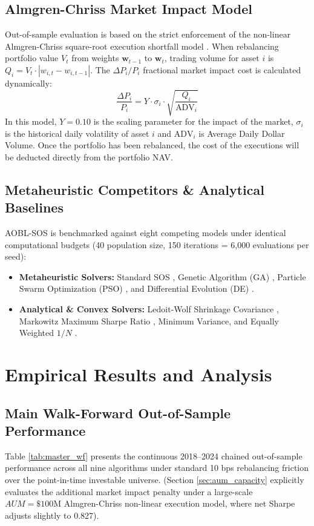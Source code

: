 \documentclass[11pt,a4paper]{article}
\begin{document}
\subsection{Almgren-Chriss Market Impact Model}
Out-of-sample evaluation is based on the strict enforcement of the non-linear Almgren-Chriss square-root execution shortfall model \cite{horst2024}. When rebalancing portfolio value $V_t$ from weights $\mathbf{w}_{t-1}$ to $\mathbf{w}_t$, trading volume for asset $i$ is $Q_i = V_t \cdot |w_{i, t} - w_{i, t-1}|$. The $\Delta P_i / P_i$ fractional market impact cost is calculated dynamically:
\begin{equation}
\frac{\Delta P_i}{P_i} = Y \cdot \sigma_i \cdot \sqrt{\frac{Q_i}{\text{ADV}_i}}
\end{equation}
In this model, $Y = 0.10$ is the scaling parameter for the impact of the market, $\sigma_i$ is the historical daily volatility of asset $i$ and $\text{ADV}_i$ is Average Daily Dollar Volume. Once the portfolio has been rebalanced, the cost of the executions will be deducted directly from the portfolio NAV.

\subsection{Metaheuristic Competitors & Analytical Baselines}
AOBL-SOS is benchmarked against eight competing models under identical computational budgets (40 population size, 150 iterations = 6,000 evaluations per seed):
\begin{itemize}
    \item \textbf{Metaheuristic Solvers:} Standard SOS \cite{cheng2014}, Genetic Algorithm (GA) \cite{holland1992}, Particle Swarm Optimization (PSO) \cite{kennedy1995}, and Differential Evolution (DE) \cite{storn1997}.
    \item \textbf{Analytical \& Convex Solvers:} Ledoit-Wolf Shrinkage Covariance \cite{ledoit2004}, Markowitz Maximum Sharpe Ratio \cite{markowitz1952}, Minimum Variance, and Equally Weighted $1/N$ \cite{demiguel2009}.
\end{itemize}

\section{Empirical Results and Analysis}

\subsection{Main Walk-Forward Out-of-Sample Performance}
Table \ref{tab:master_wf} presents the continuous 2018--2024 chained out-of-sample performance across all nine algorithms under standard 10 bps rebalancing friction over the point-in-time investable universe. (Section \ref{sec:aum_capacity} explicitly evaluates the additional market impact penalty under a large-scale $AUM = \$100\text{M}$ Almgren-Chriss non-linear execution model, where net Sharpe adjusts slightly to 0.827).
\end{document}
